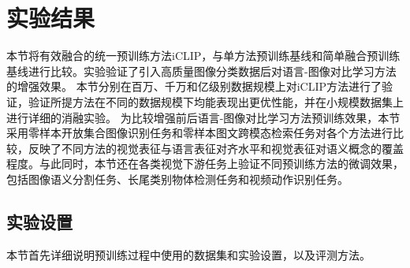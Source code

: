 \section{实验结果}
\label{sec:iclip-result}
本节将有效融合的统一预训练方法iCLIP，与单方法预训练基线和简单融合预训练基线进行比较。实验验证了引入高质量图像分类数据后对语言-图像对比学习方法的增强效果。
本节分别在百万、千万和亿级别数据规模上对iCLIP方法进行了验证，验证所提方法在不同的数据规模下均能表现出更优性能，并在小规模数据集上进行详细的消融实验。
为比较增强前后语言-图像对比学习方法预训练效果，本节采用零样本开放集合图像识别任务和零样本图文跨模态检索任务对各个方法进行比较，反映了不同方法的视觉表征与语言表征对齐水平和视觉表征对语义概念的覆盖程度。与此同时，本节还在各类视觉下游任务上验证不同预训练方法的微调效果，包括图像语义分割任务、长尾类别物体检测任务和视频动作识别任务。

\subsection{实验设置}
\label{sec:iclip-exp-setting}
本节首先详细说明预训练过程中使用的数据集和实验设置，以及评测方法。

